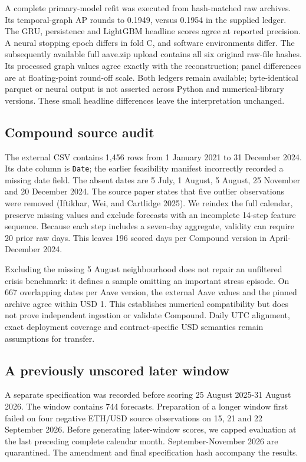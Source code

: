 \documentclass[
  10pt,
  a4paper,
]{article}
\begin{document}
A complete primary-model refit was executed from hash-matched raw
archives. Its temporal-graph AP rounds to 0.1949, versus 0.1954 in the
supplied ledger. The GRU, persistence and LightGBM headline scores agree
at reported precision. A neural stopping epoch differs in fold C, and
software environments differ. The subsequently available full aave.zip
upload contains all six original raw-file hashes. Its processed graph
values agree exactly with the reconstruction; panel differences are at
floating-point round-off scale. Both ledgers remain available;
byte-identical parquet or neural output is not asserted across Python
and numerical-library versions. These small headline differences leave
the interpretation unchanged.

\subsection{Compound source audit}\label{compound-source-audit}

The external CSV contains 1,456 rows from 1 January 2021 to 31 December
2024. Its date column is \texttt{Date}; the earlier feasibility manifest
incorrectly recorded a missing date field. The absent dates are 5 July,
1 August, 5 August, 25 November and 20 December 2024. The source paper
states that five outlier observations were removed (Iftikhar, Wei, and
Cartlidge 2025). We reindex the full calendar, preserve missing values
and exclude forecasts with an incomplete 14-step feature sequence.
Because each step includes a seven-day aggregate, validity can require
20 prior raw days. This leaves 196 scored days per Compound version in
April-December 2024.

Excluding the missing 5 August neighbourhood does not repair an
unfiltered crisis benchmark: it defines a sample omitting an important
stress episode. On 667 overlapping dates per Aave version, the external
Aave values and the pinned archive agree within USD 1. This establishes
numerical compatibility but does not prove independent ingestion or
validate Compound. Daily UTC alignment, exact deployment coverage and
contract-specific USD semantics remain assumptions for transfer.

\subsection{A previously unscored later
window}\label{a-previously-unscored-later-window}

A separate specification was recorded before scoring 25 August 2025-31
August 2026. The window contains 744 forecasts. Preparation of a longer
window first failed on four negative ETH/USD source observations on 15,
21 and 22 September 2026. Before generating later-window scores, we
capped evaluation at the last preceding complete calendar month.
September-November 2026 are quarantined. The amendment and final
specification hash accompany the results.
\end{document}
